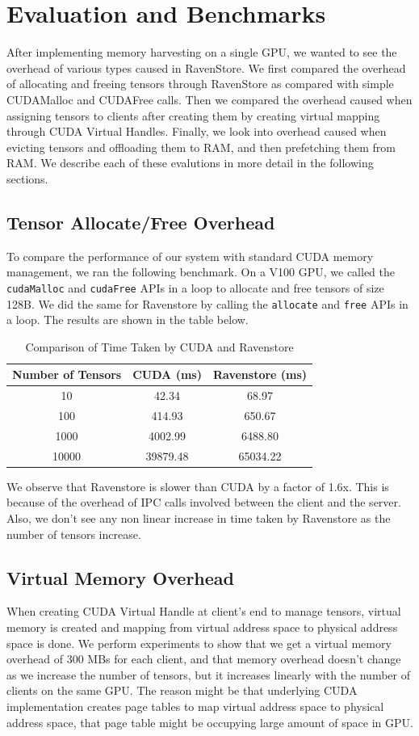 \documentclass{article}
\begin{document}
\section{Evaluation and Benchmarks}
After implementing memory harvesting on a single GPU, we wanted to see the overhead of various types caused in RavenStore.
We first compared the overhead of allocating and freeing tensors through RavenStore as compared with simple CUDAMalloc and CUDAFree
calls. Then we compared the overhead caused when assigning tensors to clients after creating them by creating virtual mapping through CUDA
Virtual Handles. Finally, we look into overhead caused when evicting tensors and offloading them to RAM, and then prefetching them from RAM.
We describe each of these evalutions in more detail in the following sections.
\subsection{Tensor Allocate/Free Overhead}
To compare the performance of our system with standard CUDA memory management, we ran the following benchmark.
On a V100 GPU, we called the \verb|cudaMalloc| and \verb|cudaFree| APIs in a loop to allocate and free tensors of size 128B. We did the same for Ravenstore by calling the \verb|allocate| and \verb|free| APIs in a loop.
The results are shown in the table below.
\begin{table}[htbp]
	\centering
	\begin{tabular}{||c|c|c||}
		\hline
		\textbf{Number of Tensors} & \textbf{CUDA (ms)} & \textbf{Ravenstore (ms)} \\
		\hline
		\hline
		10 & 42.34 & 68.97 \\
		100 & 414.93 & 650.67 \\
		1000 & 4002.99 & 6488.80 \\
		10000 & 39879.48 & 65034.22 \\
		\hline
	\end{tabular}
	\caption{Comparison of Time Taken by CUDA and Ravenstore}
\end{table}

We observe that Ravenstore is slower than CUDA by a factor of 1.6x. This is because of the overhead of IPC calls involved between the client and the server. Also, we don't see any non linear increase in time taken by Ravenstore as the number of tensors increase.

\subsection{Virtual Memory Overhead}
When creating CUDA Virtual Handle at client's end to manage tensors, virtual memory is created and mapping from
virtual address space to physical address space is done. We perform experiments to show that we get a virtual memory overhead
of 300 MBs for each client, and that memory overhead doesn't change as we increase the number of tensors, but it increases linearly
with the number of clients on the same GPU. The reason might be that underlying CUDA implementation creates page tables to map virtual address space
to physical address space, that page table might be occupying large amount of space in GPU.
\end{document}
